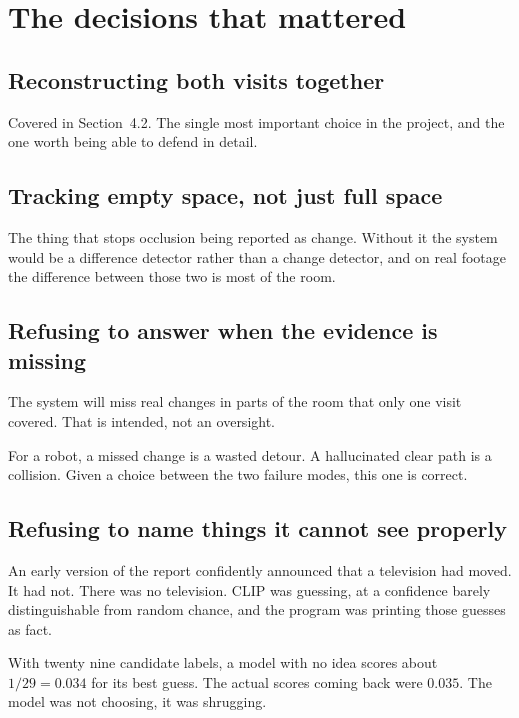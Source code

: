 \chapter{The decisions that mattered}

\section{Reconstructing both visits together}

Covered in Section~4.2. The single most important choice in the project, and the one worth being
able to defend in detail.

\section{Tracking empty space, not just full space}

The thing that stops occlusion being reported as change. Without it the system would be a
difference detector rather than a change detector, and on real footage the difference between
those two is most of the room.

\section{Refusing to answer when the evidence is missing}

The system will miss real changes in parts of the room that only one visit covered. That is
intended, not an oversight.

For a robot, a missed change is a wasted detour. A hallucinated clear path is a collision. Given a
choice between the two failure modes, this one is correct.

\section{Refusing to name things it cannot see properly}

An early version of the report confidently announced that a television had moved. It had not.
There was no television. CLIP was guessing, at a confidence barely distinguishable from random
chance, and the program was printing those guesses as fact.

\begin{plainbox}
With twenty nine candidate labels, a model with no idea scores about $1/29 = 0.034$ for its best
guess. The actual scores coming back were $0.035$. The model was not choosing, it was shrugging.
\end{plainbox}

